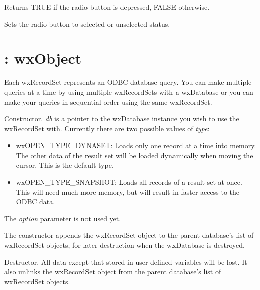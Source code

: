 Returns TRUE if the radio button is depressed, FALSE otherwise.



Sets the radio button to selected or unselected status.


\section{: wxObject}\label{wxrecordset}


Each wxRecordSet represents an ODBC database query. You can make multiple queries
at a time by using multiple wxRecordSets with a wxDatabase or you can make
your queries in sequential order using the same wxRecordSet.



Constructor. {\it db} is a pointer to the wxDatabase instance you wish to use the
wxRecordSet with. Currently there are two possible values of {\it type}:

\begin{itemize}\itemsep=0pt
\item wxOPEN\_TYPE\_DYNASET: Loads only one record at a time into memory. The other
data of the result set will be loaded dynamically when
moving the cursor. This is the default type.
\item wxOPEN\_TYPE\_SNAPSHOT: Loads all records of a result set at once. This will
need much more memory, but will result in
faster access to the ODBC data.
\end{itemize}

The {\it option} parameter is not used yet.

The constructor appends the wxRecordSet object to the parent database's list of
wxRecordSet objects, for later destruction when the wxDatabase is destroyed.



Destructor. All data except that stored in user-defined variables will be lost.
It also unlinks the wxRecordSet object from the parent database's list of
wxRecordSet objects.
 
